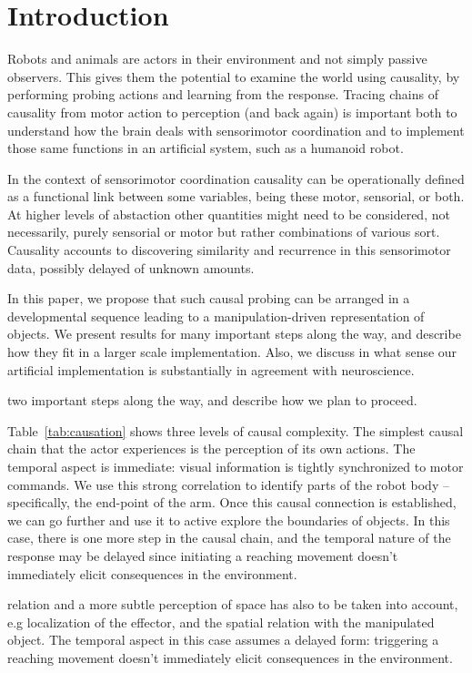 

\section{Introduction}

Robots and animals are actors in their environment and not simply passive
observers.  This gives them the potential to examine the world using
causality, by performing probing actions and learning from the
response.  Tracing chains of causality from motor action to perception
(and back again) is important both to understand how the brain deals
with sensorimotor coordination and to implement those same functions
in an artificial system, such as a humanoid robot.

\ifverbose
In the context of sensorimotor coordination causality can be operationally
defined as a functional link between some variables, being these motor,
sensorial, or both.  At higher levels of abstaction other quantities might
need to be considered, not necessarily, purely sensorial or motor but
rather combinations of various sort. Causality accounts to discovering
similarity and recurrence in this sensorimotor data, possibly delayed of
unknown amounts.
\fi

In this paper, we propose that such causal probing can be arranged in
a developmental sequence leading to a manipulation-driven
representation of objects.  We present results for many important steps
along the way, and describe how they fit in a larger scale implementation.
Also, we discuss in what sense our artificial implementation is substantially 
in agreement with neuroscience. 

\ifverbose
two important
steps along the way, and describe how we plan to proceed.
\fi

Table~\ref{tab:causation} shows three levels of causal complexity.
The simplest causal chain that the actor experiences is the
perception of its own actions.  The temporal aspect is immediate:
visual information is tightly synchronized to motor commands.
\ifverbose
We use this strong correlation to identify parts of the robot
body -- specifically, the end-point of the arm. 
\fi
Once this causal connection is established, we can go further and use
it to active explore the boundaries of objects.  In this case, there
is one more step in the causal chain, and the temporal nature of
the response may be delayed since initiating a reaching movement doesn't
immediately elicit consequences in the environment.  

\ifverbose
relation and a
more subtle perception of space has also to be taken into account, e.g
localization of the effector, and the spatial relation with the
manipulated object.  The temporal aspect in this case assumes a
delayed form: triggering a reaching movement doesn't immediately
elicit consequences in the environment.

